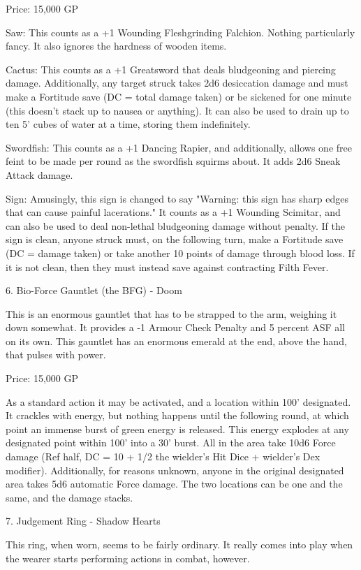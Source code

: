 \begin{multicols}{2}
Price: 15,000 GP

Saw: This counts as a +1 Wounding Fleshgrinding Falchion. Nothing particularly fancy. It also ignores the hardness of wooden items.

Cactus: This counts as a +1 Greatsword that deals bludgeoning and piercing damage. Additionally, any target struck takes 2d6 desiccation damage and must make a Fortitude save (DC = total damage taken) or be sickened for one minute (this doesn't stack up to nausea or anything). It can also be used to drain up to ten 5' cubes of water at a time, storing them indefinitely.

Swordfish: This counts as a +1 Dancing Rapier, and additionally, allows one free feint to be made per round as the swordfish squirms about. It adds 2d6 Sneak Attack damage.

Sign: Amusingly, this sign is changed to say "Warning: this sign has sharp edges that can cause painful lacerations." It counts as a +1 Wounding Scimitar, and can also be used to deal non-lethal bludgeoning damage without penalty. If the sign is clean, anyone struck must, on the following turn, make a Fortitude save (DC = damage taken) or take another 10 points of damage through blood loss. If it is not clean, then they must instead save against contracting Filth Fever.


6. Bio-Force Gauntlet (the BFG) - Doom

This is an enormous gauntlet that has to be strapped to the arm, weighing it down somewhat. It provides a -1 Armour Check Penalty and 5 percent ASF all on its own. This gauntlet has an enormous emerald at the end, above the hand, that pulses with power.

Price: 15,000 GP

As a standard action it may be activated, and a location within 100' designated. It crackles with energy, but nothing happens until the following round, at which point an immense burst of green energy is released. This energy explodes at any designated point within 100' into a 30' burst. All in the area take 10d6 Force damage (Ref half, DC = 10 + 1/2 the wielder's Hit Dice + wielder's Dex modifier). Additionally, for reasons unknown, anyone in the original designated area takes 5d6 automatic Force damage. The two locations can be one and the same, and the damage stacks.


7. Judgement Ring - Shadow Hearts

This ring, when worn, seems to be fairly ordinary. It really comes into play when the wearer starts performing actions in combat, however.


\end{multicols}
